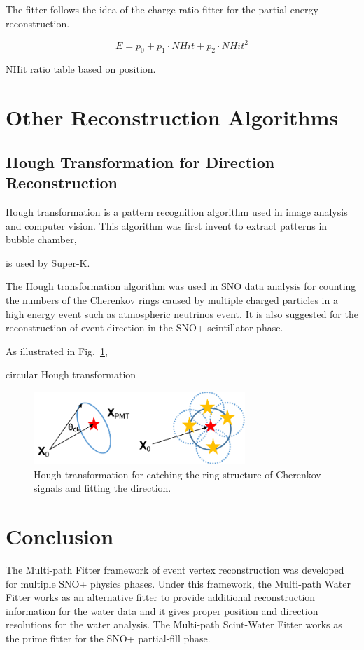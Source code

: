 The fitter follows the idea of the charge-ratio fitter for the partial energy reconstruction\cite{partialEnergyYang}.

\begin{equation}
E = p_0+p_1\cdot NHit+p_2\cdot NHit^2
\end{equation}


NHit ratio table based on position.


\section{Other Reconstruction Algorithms}
\subsection{Hough Transformation for Direction Reconstruction}

Hough transformation is a pattern recognition algorithm used in image analysis and computer vision\cite{davies1997machine}. This algorithm was first invent to extract patterns in bubble chamber\cite{houghwiki}, 

is used by Super-K\cite{shiozawa1999reconstruction}.

The Hough transformation algorithm was used in SNO data analysis for counting the numbers of the Cherenkov rings caused by multiple charged particles in a high energy event such as atmospheric neutrinos event\cite{bonventre2014neutron}. It is also suggested for the reconstruction of event direction in the SNO+ scintillator phase\cite{houghTransform}.

As illustrated in Fig.~\ref{houghTrans}, 


circular Hough transformation
\begin{figure}[!htb]
	\centering
	\includegraphics[width=8cm]{houghTransform.png}
	\caption{Hough transformation for catching the ring structure of Cherenkov signals and fitting the direction.}
	\label{houghTrans}
\end{figure}

\section{Conclusion}
The Multi-path Fitter framework of event vertex reconstruction was developed for multiple SNO+ physics phases. Under this framework, the Multi-path Water Fitter works as an alternative fitter to provide additional reconstruction information for the water data and it gives proper position and direction resolutions for the water analysis. The Multi-path Scint-Water Fitter works as the prime fitter for the SNO+ partial-fill phase.